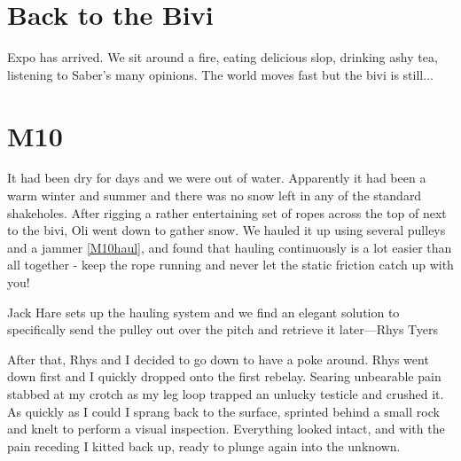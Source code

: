 \section{Back to the Bivi}

\begin{marginfigure}
\end{marginfigure}

Expo has arrived. We sit around a fire, eating delicious slop, drinking ashy tea, listening  to Saber's many opinions. The world moves fast but the bivi is still...

\section{M10}
It had been dry for days and we were out of water. Apparently it had been a warm winter and summer and there was no snow left in any of the standard shakeholes. After rigging a rather entertaining set of ropes across the top of  next to the bivi, Oli went down to gather snow. We hauled it up using several pulleys and a jammer \vref{M10haul}, and found that hauling continuously is a lot easier than all together - keep the rope running and never let the static friction catch up with you!

\begin{marginfigure}
\checkoddpage \ifoddpage \forcerectofloat \else \forceversofloat \fi
\centering
 \caption{Jack Hare sets up the hauling system and we find an elegant solution to specifically send the pulley out over the pitch and retrieve it later---Rhys Tyers}
 \label{M10haul}
\end{marginfigure}

After that, Rhys and I decided to go down to have a poke around. Rhys went down first and I quickly dropped onto the first rebelay. Searing unbearable pain stabbed at my crotch as my leg loop trapped an unlucky testicle and crushed it. As quickly as I could I sprang back to the surface, sprinted behind a small rock and knelt to perform a visual inspection. Everything looked intact, and with the pain receding I kitted back up, ready to plunge again into the unknown.

